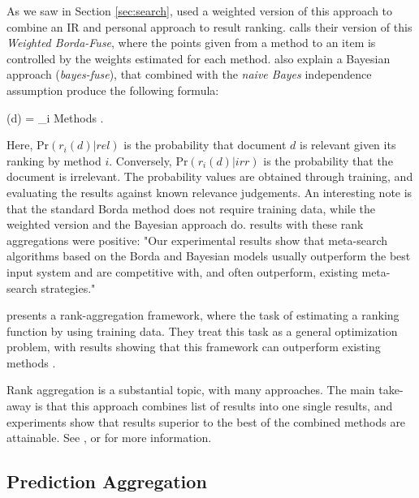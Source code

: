 As we saw in Section \ref{sec:search}, \citet[p3]{Xu2008} used a weighted version
of this approach to combine an IR and personal approach to result ranking.
\citet[p3]{Aslam2001} calls their version of this \emph{Weighted Borda-Fuse},
where the points given from a method to an item is controlled
by the weights estimated for each method.
\citet[p4]{Aslam2001} also explain a Bayesian approach (\emph{bayes-fuse}),
that combined with the \emph{naive Bayes} independence assumption 
produce the following formula:

\begin{eqsp}
  (d)  = \sum_{i \in Methods} \log 
    .
\end{eqsp}
%
Here, $\mathrm{Pr}(r_i(d) | rel)$ is the probability that document $d$
is relevant given its ranking by method $i$.
Conversely, $\mathrm{Pr}(r_i(d) | irr)$ is the probability that the document 
is irrelevant. The probability values are obtained through training,
and evaluating the results against known relevance judgements.
An interesting note is that the standard Borda method does not require training data,
while the weighted version and the Bayesian approach do.
\citet[p1]{Aslam2001} results with these rank aggregations were positive:
"Our experimental results show that meta-search algorithms based on the 
Borda and Bayesian models usually outperform the best input system 
and are competitive with, and often outperform, 
existing meta-search strategies."

\cite{Liu2007} presents a rank-aggregation framework, where
the task of estimating a ranking function by using training data.
They treat this task as a general optimization problem, with results
showing that this framework can outperform existing methods \cite[p7]{Liu2007}.

Rank aggregation is a substantial topic, with many approaches.
The main take-away is that this approach combines list of results
into one single results, and experiments show that results superior
to the best of the combined methods are attainable.
See \cite{Aslam2001}, \cite{Liu2007} or \cite{Klementiev2008} 
for more information.

\clearpage

\subsection{Prediction Aggregation}
\label{sec:theory:predictionagg}


